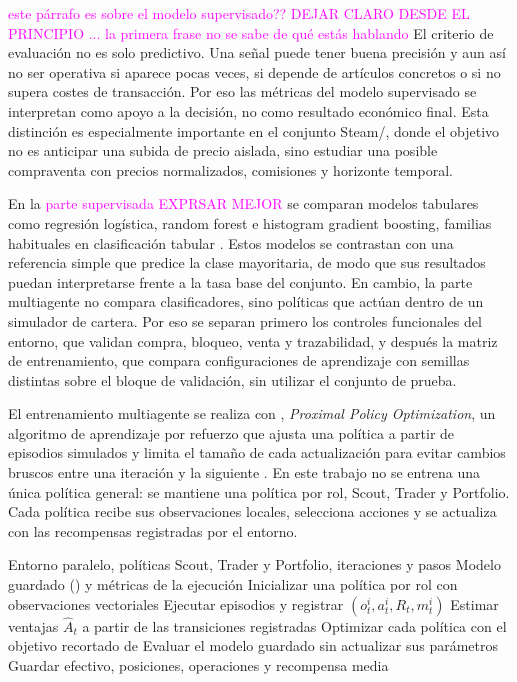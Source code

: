 \textcolor{magenta}{este párrafo es sobre el modelo supervisado?? DEJAR CLARO DESDE EL PRINCIPIO ... la primera frase no se sabe de qué estás hablando}
El criterio de evaluación no es solo predictivo. Una señal puede tener buena precisión y aun así no ser operativa si aparece pocas veces, si depende de artículos concretos o si no supera costes de transacción. Por eso las métricas del modelo supervisado se interpretan como apoyo a la decisión, no como resultado económico final. Esta distinción es especialmente importante en el conjunto Steam/, donde el objetivo no es anticipar una subida de precio aislada, sino estudiar una posible compraventa con precios normalizados, comisiones y horizonte temporal.

En la \textcolor{magenta}{parte supervisada EXPRSAR MEJOR} se comparan modelos tabulares como regresión logística, random forest e histogram gradient boosting, familias habituales en clasificación tabular \cite{breiman2001random,friedman2001greedy}. Estos modelos se contrastan con una referencia simple que predice la clase mayoritaria, de modo que sus resultados puedan interpretarse frente a la tasa base del conjunto. En cambio, la parte multiagente no compara clasificadores, sino políticas que actúan dentro de un simulador de cartera. Por eso se separan primero los controles funcionales del entorno, que validan compra, bloqueo, venta y trazabilidad, y después la matriz de entrenamiento, que compara configuraciones de aprendizaje con semillas distintas sobre el bloque de validación, sin utilizar el conjunto de prueba.

El entrenamiento multiagente se realiza con , \emph{Proximal Policy Optimization}, un algoritmo de aprendizaje por refuerzo que ajusta una política a partir de episodios simulados y limita el tamaño de cada actualización para evitar cambios bruscos entre una iteración y la siguiente \cite{schulman2017ppo}. En este trabajo no se entrena una única política general: se mantiene una política por rol, Scout, Trader y Portfolio. Cada política recibe sus observaciones locales, selecciona acciones y se actualiza con las recompensas registradas por el entorno.

\begin{algorithm}[H]
\caption{Entrenamiento con PPO}
\label{alg:entrenamiento-ppo}
\begin{algorithmic}[1]
\Require Entorno paralelo, políticas Scout, Trader y Portfolio, iteraciones y pasos
\Ensure Modelo guardado () y métricas de la ejecución
\State Inicializar una política  por rol con observaciones vectoriales
  \State Ejecutar episodios y registrar $(o_t^i,a_t^i,R_t,m_t^i)$
  \State Estimar ventajas $\widehat{A}_t$ a partir de las transiciones registradas
  \State Optimizar cada política con el objetivo recortado de 
\EndFor
\State Evaluar el modelo guardado sin actualizar sus parámetros
\State Guardar efectivo, posiciones, operaciones y recompensa media
\end{algorithmic}
\end{algorithm}

